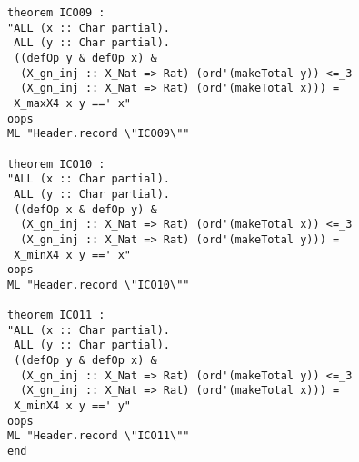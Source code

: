 \begin{multicols}{2}
\begin{Verbatim}
theorem ICO09 :
"ALL (x :: Char partial).
 ALL (y :: Char partial).
 ((defOp y & defOp x) &
  (X_gn_inj :: X_Nat => Rat) (ord'(makeTotal y)) <=_3
  (X_gn_inj :: X_Nat => Rat) (ord'(makeTotal x))) =
 X_maxX4 x y ==' x"
oops
ML "Header.record \"ICO09\""

theorem ICO10 :
"ALL (x :: Char partial).
 ALL (y :: Char partial).
 ((defOp x & defOp y) &
  (X_gn_inj :: X_Nat => Rat) (ord'(makeTotal x)) <=_3
  (X_gn_inj :: X_Nat => Rat) (ord'(makeTotal y))) =
 X_minX4 x y ==' x"
oops
ML "Header.record \"ICO10\""

theorem ICO11 :
"ALL (x :: Char partial).
 ALL (y :: Char partial).
 ((defOp y & defOp x) &
  (X_gn_inj :: X_Nat => Rat) (ord'(makeTotal y)) <=_3
  (X_gn_inj :: X_Nat => Rat) (ord'(makeTotal x))) =
 X_minX4 x y ==' y"
oops
ML "Header.record \"ICO11\""
end
\end{Verbatim}
\end{multicols}
